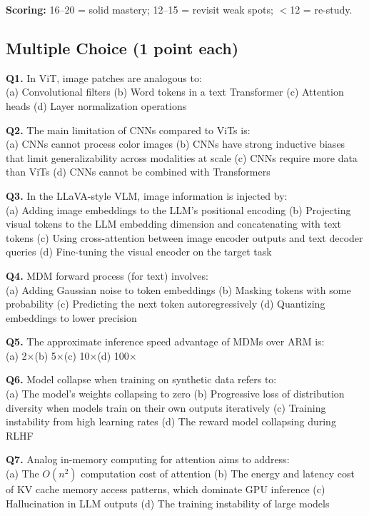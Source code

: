 \documentclass[11pt, a4paper]{article}
\begin{document}
\textbf{Scoring:} 16--20 = solid mastery; 12--15 = revisit weak spots; $<$12 = re-study.

\subsection*{Multiple Choice (1 point each)}

\textbf{Q1.} In ViT, image patches are analogous to:\\
(a) Convolutional filters\quad
(b) Word tokens in a text Transformer\quad
(c) Attention heads\quad
(d) Layer normalization operations

\textbf{Q2.} The main limitation of CNNs compared to ViTs is:\\
(a) CNNs cannot process color images\quad
(b) CNNs have strong inductive biases that limit generalizability across modalities at scale\quad
(c) CNNs require more data than ViTs\quad
(d) CNNs cannot be combined with Transformers

\textbf{Q3.} In the LLaVA-style VLM, image information is injected by:\\
(a) Adding image embeddings to the LLM's positional encoding\quad
(b) Projecting visual tokens to the LLM embedding dimension and concatenating with text tokens\quad
(c) Using cross-attention between image encoder outputs and text decoder queries\quad
(d) Fine-tuning the visual encoder on the target task

\textbf{Q4.} MDM forward process (for text) involves:\\
(a) Adding Gaussian noise to token embeddings\quad
(b) Masking tokens with some probability\quad
(c) Predicting the next token autoregressively\quad
(d) Quantizing embeddings to lower precision

\textbf{Q5.} The approximate inference speed advantage of MDMs over ARM is:\\
(a) 2$\times$\quad (b) 5$\times$\quad (c) 10$\times$\quad (d) 100$\times$

\textbf{Q6.} Model collapse when training on synthetic data refers to:\\
(a) The model's weights collapsing to zero\quad
(b) Progressive loss of distribution diversity when models train on their own outputs iteratively\quad
(c) Training instability from high learning rates\quad
(d) The reward model collapsing during RLHF

\textbf{Q7.} Analog in-memory computing for attention aims to address:\\
(a) The $O(n^2)$ computation cost of attention\quad
(b) The energy and latency cost of KV cache memory access patterns, which dominate GPU inference\quad
(c) Hallucination in LLM outputs\quad
(d) The training instability of large models
\end{document}
